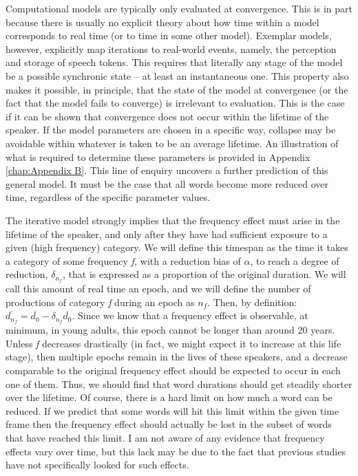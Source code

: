 Computational models are typically only evaluated at convergence.
This is in part because there is usually no explicit theory about
how time within a model corresponds to real time (or to time in some
other model). Exemplar models, however, explicitly map iterations
to real-world events, namely, the perception and storage of speech
tokens. This requires that literally any stage of the model be a possible
synchronic state – at least an instantaneous one. This property also
makes it possible, in principle, that the state of the model at convergence
(or the fact that the model fails to converge) is irrelevant to evaluation.
This is the case if it can be shown that convergence does not occur
within the lifetime of the speaker. If the model parameters are chosen
in a specific way, collapse may be avoidable within whatever is taken
to be an average lifetime. An illustration of what is required to
determine these parameters is provided in Appendix \ref{chap:Appendix B}.
This line of enquiry uncovers a further prediction of this general
model. It must be the case that all words become more reduced over
time, regardless of the specific parameter values. 

The iterative model strongly implies that the frequency effect must
arise in the lifetime of the speaker, and only after they have had
sufficient exposure to a given (high frequency) category. We will
define this timespan as the time it takes a category of some frequency
\emph{f,} with a reduction bias of $\alpha$, to reach a degree of
reduction, $\delta_{n_{f}}$, that is expressed as a proportion of
the original duration. We will call this amount of real time an epoch,
and we will define the number of productions of category \emph{f}
during an epoch as $n_{f}$. Then, by definition: $\overline{d_{n_{f}}}=\overline{d_{0}}-\delta_{n_{f}}\overline{d_{0}}$.
Since we know that a frequency effect is observable, at minimum, in
young adults, this epoch cannot be longer than around 20 years. Unless
\emph{f }decreases drastically (in fact, we might expect it to increase
at this life stage), then multiple epochs remain in the lives of these
speakers, and a decrease comparable to the original frequency effect
should be expected to occur in each one of them. Thus, we should find
that word durations should get steadily shorter over the lifetime.
Of course, there is a hard limit on how much a word can be reduced.
If we predict that some words will hit this limit within the given
time frame then the frequency effect should actually be lost in the
subset of words that have reached this limit. I am not aware of any evidence
that frequency effects vary over time, but this lack may be due to the fact that
previous studies have not specifically looked for such effects.


